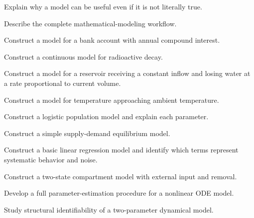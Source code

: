 \begin{exercise}[3]
Explain why a model can be useful even if it is not literally true.
\end{exercise}

\begin{exercise}[3]
Describe the complete mathematical-modeling workflow.
\end{exercise}

\begin{exercise}[3]
Construct a model for a bank account with annual compound interest.
\end{exercise}

\begin{exercise}[3]
Construct a continuous model for radioactive decay.
\end{exercise}

\begin{exercise}[3]
Construct a model for a reservoir receiving a constant inflow and losing
water at a rate proportional to current volume.
\end{exercise}

\begin{exercise}[3]
Construct a model for temperature approaching ambient temperature.
\end{exercise}

\begin{exercise}[3]
Construct a logistic population model and explain each parameter.
\end{exercise}

\begin{exercise}[3]
Construct a simple supply-demand equilibrium model.
\end{exercise}

\begin{exercise}[3]
Construct a basic linear regression model and identify which terms represent
systematic behavior and noise.
\end{exercise}

\begin{exercise}[3]
Construct a two-state compartment model with external input and removal.
\end{exercise}

\begin{exercise}[4]
Develop a full parameter-estimation procedure for a nonlinear ODE model.
\end{exercise}

\begin{exercise}[4]
Study structural identifiability of a two-parameter dynamical model.
\end{exercise}

